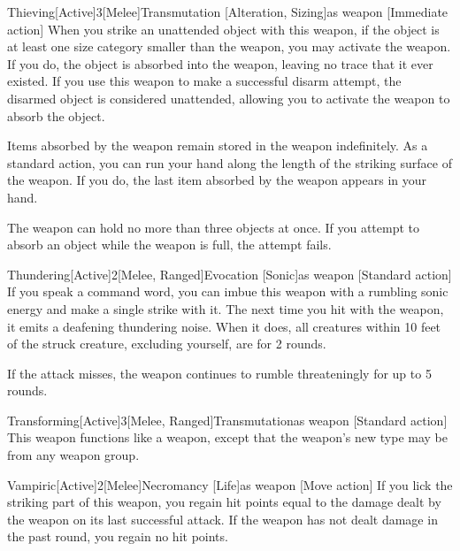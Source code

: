         \begin{magicitemdef}{Thieving}[Active]{3}[Melee]{Transmutation [Alteration, Sizing]}{as weapon}
            [Immediate action] When you strike an unattended object with this weapon, if the object is at least one size category smaller than the weapon, you may activate the weapon.
            If you do, the object is absorbed into the weapon, leaving no trace that it ever existed.
            If you use this weapon to make a successful disarm attempt, the disarmed object is considered unattended, allowing you to activate the weapon to absorb the object.

             Items absorbed by the weapon remain stored in the weapon indefinitely.
            As a standard action, you can run your hand along the length of the striking surface of the weapon.
            If you do, the last item absorbed by the weapon appears in your hand.

            The weapon can hold no more than three objects at once.
            If you attempt to absorb an object while the weapon is full, the attempt fails.
        \end{magicitemdef}

        \begin{magicitemdef}{Thundering}[Active]{2}[Melee, Ranged]{Evocation [Sonic]}{as weapon}
            [Standard action] If you speak a command word, you can imbue this weapon with a rumbling sonic energy and make a single strike with it.
            The next time you hit with the weapon, it emits a deafening thundering noise.
            When it does, all creatures within 10 feet of the struck creature, excluding yourself, are \deafened for 2 rounds.

            If the attack misses, the weapon continues to rumble threateningly for up to 5 rounds.
        \end{magicitemdef}

        \begin{magicitemdef}{Transforming}[Active]{3}[Melee, Ranged]{Transmutation}{as weapon}
            [Standard action] This weapon functions like a  weapon, except that the weapon's new type may be from any weapon group.
        \end{magicitemdef}

        \begin{magicitemdef}{Vampiric}[Active]{2}[Melee]{Necromancy [Life]}{as weapon}
            [Move action] If you lick the striking part of this weapon, you regain hit points equal to the damage dealt by the weapon on its last successful attack.
            If the weapon has not dealt damage in the past round, you regain no hit points.
        \end{magicitemdef}

